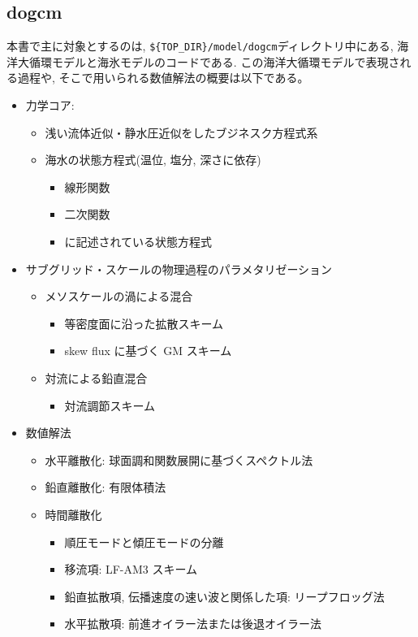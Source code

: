 \subsection*{dogcm}
本書で主に対象とするのは, \verb|${TOP_DIR}/model/dogcm|ディレクトリ中にある, 海洋大循環モデルと海氷モデルのコードである. 
この海洋大循環モデルで表現される過程や, そこで用いられる数値解法の概要は以下である。
\begin{itemize}
  \item 力学コア: 
  \begin{itemize}
    \item 浅い流体近似・静水圧近似をしたブジネスク方程式系
    \item 海水の状態方程式(温位, 塩分, 深さに依存)
    \begin{itemize}
      \item 線形関数 
      \item 二次関数 \citep{vallis2006AOFD}
      \item \cite{jackett1995minimal}に記述されている状態方程式
    \end{itemize}  
  \end{itemize}
  \item サブグリッド・スケールの物理過程のパラメタリゼーション
    \begin{itemize}
      \item メソスケールの渦による混合
      \begin{itemize}  
        \item 等密度面に沿った拡散スキーム \citep{redi1982oceanic} 
        \item skew flux に基づく GM スキーム \citep{gent1990isopycnal,griffies1998gent}
      \end{itemize} 
      \item 対流による鉛直混合
      \begin{itemize}  
        \item 対流調節スキーム \citep{marotzke1991influence,rahmstorf1993fast}
      \end{itemize}   
    \end{itemize} 
  \item 数値解法
  \begin{itemize}
    \item 水平離散化: 球面調和関数展開に基づくスペクトル法
    \item 鉛直離散化: 有限体積法
    \item 時間離散化
    \begin{itemize}
      \item 順圧モードと傾圧モードの分離　\citep{shchepetkin2005regional}
      \item 移流項: LF-AM3 スキーム \citep{shchepetkin2005regional}
  	  \item 鉛直拡散項, 伝播速度の速い波と関係した項: リープフロッグ法
  	  \item 水平拡散項: 前進オイラー法または後退オイラー法
    \end{itemize}                  
  \end{itemize}
\end{itemize}
